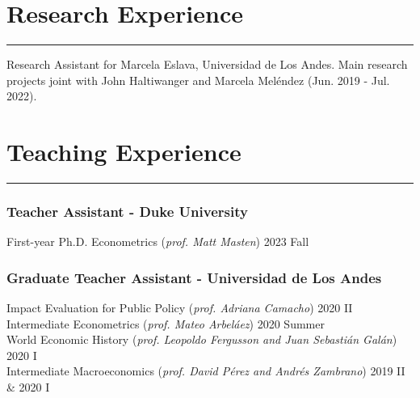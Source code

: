 \documentclass[12pt, letterpaper]{article}
\begin{document}



\vspace{-6mm}

\section*{Research Experience}
\vspace*{-8mm}
\noindent \rule{\linewidth}{0.2mm}
\noindent
Research Assistant for Marcela Eslava, Universidad de Los Andes. Main research projects joint with John Haltiwanger and Marcela Meléndez (Jun. 2019 - Jul. 2022).  \\ 

\vspace{-6mm}


\section*{Teaching Experience}
\vspace*{-8mm}
\noindent \rule{\linewidth}{0.2mm}
\vspace*{-10mm}
\subsubsection*{Teacher Assistant - Duke University}
\vspace*{-1mm}
\noindent 
First-year Ph.D. Econometrics \hspace{5mm}  (\textit{prof. Matt Masten}) \hfill 2023 Fall \\
\vspace*{-7mm}
\subsubsection*{Graduate Teacher Assistant - Universidad de Los Andes}
\vspace*{-1mm}
\noindent
Impact Evaluation for Public Policy  \hspace{5mm} (\textit{prof. Adriana Camacho}) \hfill 2020 II \\
Intermediate Econometrics  \hspace{5mm} (\textit{prof. Mateo Arbeláez}) \hfill 2020 Summer \\
World Economic History  \hspace{5mm} (\small{\textit{prof. Leopoldo Fergusson and Juan Sebastián Galán}})  \hfill  2020 I  \\
Intermediate Macroeconomics \hspace{5mm}  (\textit{prof. David Pérez and Andrés Zambrano}) \hfill 2019 II \& 2020 I \\
\end{document}
